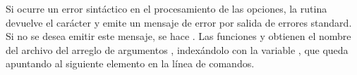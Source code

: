 Si ocurre un error sintáctico en el procesamiento de las opciones, la rutina
devuelve el carácter  y emite un mensaje de error por salida de errores
standard. Si no se desea emitir este mensaje, se hace .
Las funciones  y  obtienen el nombre del archivo del
arreglo de argumentos , indexándolo con la variable , que queda
apuntando al siguiente elemento en la línea de comandos.


